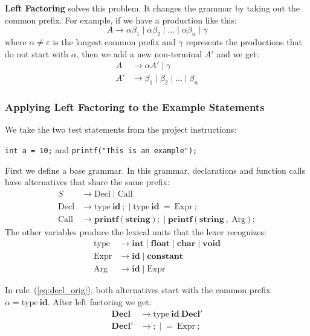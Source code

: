 \documentclass[letterpaper,12pt,oneside]{article}
\begin{document}
\textbf{Left Factoring} solves this problem. It changes the grammar by taking out the common prefix. For example, if we have a production like this:
\begin{equation}
    A \to \alpha \beta_1 \mid \alpha \beta_2 \mid \dots \mid \alpha \beta_n \mid \gamma
\end{equation}
where $\alpha \neq \varepsilon$ is the longest common prefix and $\gamma$ represents the productions that do not start with $\alpha$, then we add a new non-terminal $A'$ and we get:
\begin{align}
    A &\to \alpha A' \mid \gamma \\
    A' &\to \beta_1 \mid \beta_2 \mid \dots \mid \beta_n
\end{align}

\subsubsection{Applying Left Factoring to the Example Statements}
We take the two test statements from the project instructions:
\begin{center}
    \texttt{int a = 10;} \quad and \quad \texttt{printf("This is an example");}
\end{center}

First we define a base grammar. In this grammar, declarations and function calls have alternatives that share the same prefix:
\begin{align}
    S &\to \text{Decl} \mid \text{Call} \\
    \text{Decl} &\to \text{type} \ \mathbf{id} \ \mathbf{;} \;\Big|\; \text{type} \ \mathbf{id} \ \mathbf{=} \ \text{Expr} \ \mathbf{;} \label{eq:decl_orig} \\
    \text{Call} &\to \mathbf{printf} \ \mathbf{(} \ \mathbf{string} \ \mathbf{)} \ \mathbf{;} \;\Big|\; \mathbf{printf} \ \mathbf{(} \ \mathbf{string} \ \mathbf{,} \ \text{Arg} \ \mathbf{)} \ \mathbf{;} \label{eq:call_orig}
\end{align}
The other variables produce the lexical units that the lexer recognizes:
\begin{align}
    \text{type} &\to \mathbf{int} \mid \mathbf{float} \mid \mathbf{char} \mid \mathbf{void} \\
    \text{Expr} &\to \mathbf{id} \mid \mathbf{constant} \\
    \text{Arg} &\to \mathbf{id} \mid \text{Expr}
\end{align}

In rule~(\ref{eq:decl_orig}), both alternatives start with the common prefix $\alpha = \text{type} \ \mathbf{id}$. After left factoring we get:
\begin{align}
    \mathbf{Decl} &\to \text{type} \ \mathbf{id} \ \mathbf{Decl'} \\
    \mathbf{Decl'} &\to \mathbf{;} \;\Big|\; \mathbf{=} \ \text{Expr} \ \mathbf{;}
\end{align}
\end{document}
